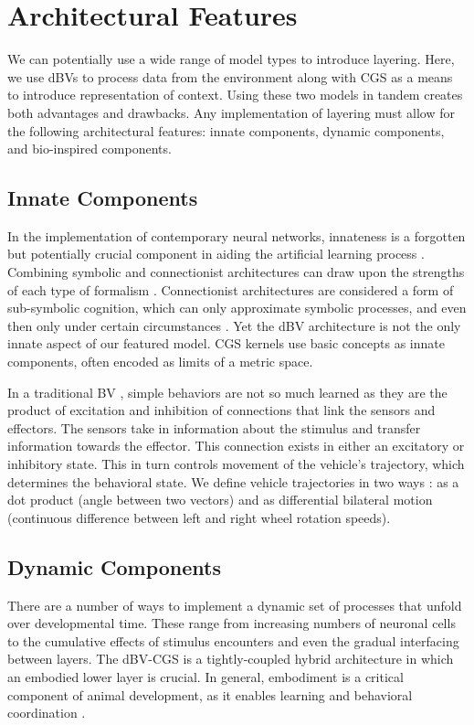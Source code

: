 \documentclass[letterpaper]{article}
\begin{document}
\section{Architectural Features}
We can potentially use a wide range of model types to introduce layering. Here, we use dBVs to process data from the environment along with CGS as a means to introduce representation of context. Using these two models in tandem creates both advantages and drawbacks. Any implementation of layering must allow for the following architectural features: innate components, dynamic components, and bio-inspired components.

\subsection{Innate Components}
In the implementation of contemporary neural networks, innateness is a forgotten but potentially crucial component in aiding the artificial learning process \citep{[11]}. Combining symbolic and connectionist architectures can draw upon the strengths of each type of formalism \citep{[12]}. Connectionist architectures are considered a form of sub-symbolic cognition, which can only approximate symbolic processes, and even then only under certain circumstances \citep{[13]}. Yet the dBV architecture is not the only innate aspect of our featured model. CGS kernels use basic concepts as innate components, often encoded as limits of a metric space.

In a traditional BV \citep{[6]}, simple behaviors are not so much learned as they are the product of excitation and inhibition of connections that link the sensors and effectors. The sensors take in information about the stimulus and transfer information towards the effector. This connection exists in either an excitatory or inhibitory state. This in turn controls movement of the vehicle's trajectory, which determines the behavioral state. We define vehicle trajectories in two ways \citep{[6]}: as a dot product (angle between two vectors) and as differential bilateral motion (continuous difference between left and right wheel rotation speeds). 

\subsection{Dynamic Components}
There are a number of ways to implement a dynamic set of processes that unfold over developmental time. These range from increasing numbers of neuronal cells to the cumulative effects of stimulus encounters and even the gradual interfacing between layers. The dBV-CGS is a tightly-coupled hybrid architecture \citep{[11]} in which an embodied lower layer is crucial. In general, embodiment is a critical component of animal development, as it enables learning and behavioral coordination \citep{[14]}.
\end{document}
